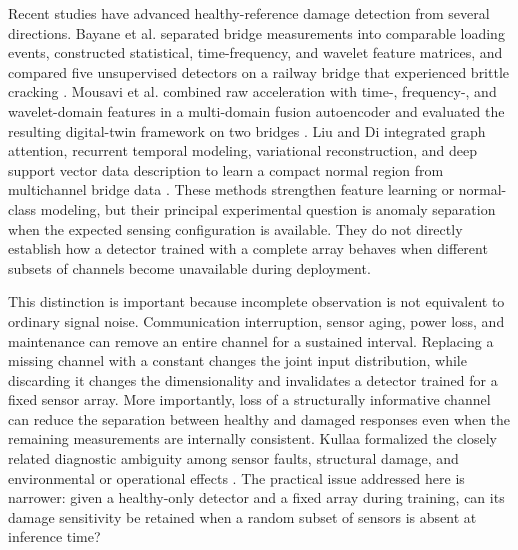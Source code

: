 \documentclass[a4paper,fleqn]{cas-sc}
\begin{document}
Recent studies have advanced healthy-reference damage detection from several directions. Bayane et al. separated bridge measurements into comparable loading events, constructed statistical, time-frequency, and wavelet feature matrices, and compared five unsupervised detectors on a railway bridge that experienced brittle cracking \cite{bayane2024unsupervised}. Mousavi et al. combined raw acceleration with time-, frequency-, and wavelet-domain features in a multi-domain fusion autoencoder and evaluated the resulting digital-twin framework on two bridges \cite{mousavi2026digital}. Liu and Di integrated graph attention, recurrent temporal modeling, variational reconstruction, and deep support vector data description to learn a compact normal region from multichannel bridge data \cite{liu2026stvr}. These methods strengthen feature learning or normal-class modeling, but their principal experimental question is anomaly separation when the expected sensing configuration is available. They do not directly establish how a detector trained with a complete array behaves when different subsets of channels become unavailable during deployment.

This distinction is important because incomplete observation is not equivalent to ordinary signal noise. Communication interruption, sensor aging, power loss, and maintenance can remove an entire channel for a sustained interval. Replacing a missing channel with a constant changes the joint input distribution, while discarding it changes the dimensionality and invalidates a detector trained for a fixed sensor array. More importantly, loss of a structurally informative channel can reduce the separation between healthy and damaged responses even when the remaining measurements are internally consistent. Kullaa formalized the closely related diagnostic ambiguity among sensor faults, structural damage, and environmental or operational effects \cite{kullaa2011distinguishing}. The practical issue addressed here is narrower: given a healthy-only detector and a fixed array during training, can its damage sensitivity be retained when a random subset of sensors is absent at inference time?
\end{document}
